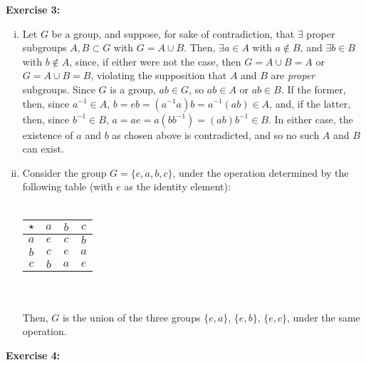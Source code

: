 \documentclass{article}%
\begin{document}
\textbf{Exercise 3:} 
\begin{enumerate}[i.]
	\item Let $G$ be a group, and suppose, for sake of
contradiction, that $\exists$ proper subgroups $A,B \subset G$ with
$G = A \cup B$. Then, $\exists a \in A$ with $a \not \in B$, and
$\exists b \in B$ with $b \not \in A$, since, if either were not the case,
then $G = A \cup B = A$ or $G = A \cup B = B$, violating the supposition that
$A$ and $B$ are \emph{proper} subgroups. Since $G$ is a group, $ab \in G$,
so $ab \in A$ or $ab \in B$. If the former, then, since $a^{-1} \in A$,
$b = eb = \left( a^{-1}a \right) b = a^{-1}(ab) \in A$, and, if the latter,
then, since $b^{-1} \in B$, $a = ae  = a \left( bb^{-1} \right) = (ab)b^{-1}
\in B$. In either case, the existence of $a$ and $b$ as chosen above is
contradicted, and so no such $A$ and $B$ can exist.
	\item Consider the group $G = \{e, a, b, c\}$, under the
operation determined by the following table (with $e$ as the identity
element): \\ \\
\begin{tabular}{ c | c c c}
$\star$ & $a$ & $b$ & $c$ \\
\hline
    $a$ & $e$ & $c$ & $b$ \\
    $b$ & $c$ & $e$ & $a$ \\
    $c$ & $b$ & $a$ & $e$ \\
\end{tabular}\\ \\

Then, $G$ is the union of the three groups $\{e,a\}$, $\{e,b\}$, $\{e,c\}$,
under the same operation.

\end{enumerate}
\textbf{Exercise 4:} 
\end{document}
